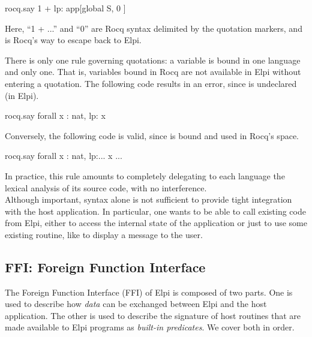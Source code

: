 \documentclass[a4paper, 11pt]{book}
\begin{document}
\begin{elpicode}
  rocq.say {{ 1 + lp:{{ app[global S, {{ 0  }} ]  }}    }}
\end{elpicode}

\noindent
Here, ``1 + ...'' and ``0'' are Rocq syntax delimited by the quotation
markers, and  is Rocq's way to escape back to Elpi.


There is only one rule governing quotations: a variable is bound in one language and only one. That
is, variables bound in Rocq are not available in Elpi without entering a
quotation. The following code results in an error, since  is undeclared
(in Elpi).

\begin{elpicode}
  rocq.say {{ forall x : nat, lp:{{ x }} }}
\end{elpicode}


\noindent
Conversely, the following code is valid, since  is bound and used in
Rocq's space.

\begin{elpicode}
  rocq.say {{ forall x : nat, lp:{{... {{ x }} ...}} }}
\end{elpicode}


\noindent
In practice, this rule amounts to completely delegating to each language the
lexical analysis of its source code, with no interference.
~\\

Although important, syntax alone is not sufficient to provide tight integration with the host
application. In particular, one wants to be able to call existing code from
Elpi, either to access the internal state of the application or just to use
some existing routine, like  to display a message to the user.


\subsection{FFI: Foreign Function Interface}\label{FFI}

The Foreign Function Interface (FFI) of Elpi is composed of two parts. One is
used to describe how \emph{data} can be exchanged between Elpi and the host
application. The other is used to describe the signature of host routines that
are made available to Elpi programs as \emph{built-in predicates}. We cover
both in order.
\end{document}
